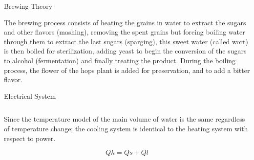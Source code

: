 \documentclass[final]{beamer}
\newlength{\onecolwid}
\newlength{\twocolwid}
\begin{document}
\begin{frame}[t]
\begin{columns}[t]
\begin{column}{\twocolwid}
\begin{columns}[t,totalwidth=\twocolwid]
\begin{column}{\onecolwid}

\end{column} %

\end{columns} %


\begin{alertblock}{Brewing Theory}

The brewing process consists of heating the grains in water to extract the sugars and other flavors (mashing), removing the spent grains but forcing boiling water through them to extract the last sugars (sparging), this sweet water (called wort) is then boiled for sterilization, adding yeast to begin the conversion of the sugars to alcohol (fermentation) and finally treating the product.  During the boiling process, the flower of the hops plant is added for preservation, and to add a bitter flavor.

\end{alertblock} 


\begin{block}{Electrical System}
\end{block}

\begin{columns}[t,totalwidth=\twocolwid] %

\begin{column}{\onecolwid} %
Since the temperature model of the main volume of water is the same regardless of  temperature change; the cooling system is identical to the heating system with respect to power.

\begin{equation}
Qh = Qs + Ql
\label{eq:heat-system}
\end{equation}


\end{column}
\end{columns}
\end{column}
\end{columns}
\end{frame}
\end{document}
